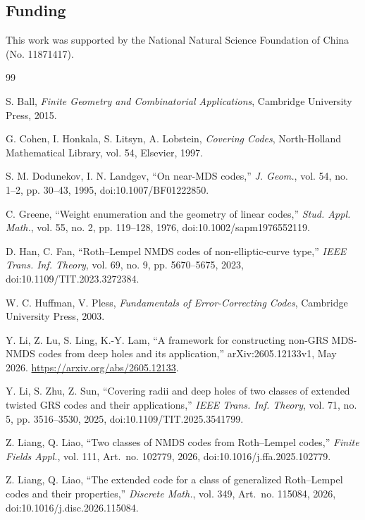 ﻿\documentclass[11pt]{article}
\theoremstyle{plain}
\theoremstyle{definition}
\begin{document}
\subsection*{Funding}
This work was supported by the National Natural Science Foundation of China
(No. 11871417).

\begingroup
{}
\begin{thebibliography}{99}

S. Ball,
\emph{Finite Geometry and Combinatorial Applications},
Cambridge University Press, 2015.

G. Cohen, I. Honkala, S. Litsyn, A. Lobstein,
\emph{Covering Codes},
North-Holland Mathematical Library, vol. 54, Elsevier, 1997.

S. M. Dodunekov, I. N. Landgev,
``On near-MDS codes,''
\emph{J. Geom.}, vol. 54, no. 1--2, pp. 30--43, 1995,
doi:10.1007/BF01222850.

C. Greene,
``Weight enumeration and the geometry of linear codes,''
\emph{Stud. Appl. Math.}, vol. 55, no. 2, pp. 119--128, 1976,
doi:10.1002/sapm1976552119.

D. Han, C. Fan,
``Roth--Lempel NMDS codes of non-elliptic-curve type,''
\emph{IEEE Trans. Inf. Theory}, vol. 69, no. 9, pp. 5670--5675, 2023,
doi:10.1109/TIT.2023.3272384.

W. C. Huffman, V. Pless,
\emph{Fundamentals of Error-Correcting Codes},
Cambridge University Press, 2003.

Y. Li, Z. Lu, S. Ling, K.-Y. Lam,
``A framework for constructing non-GRS MDS-NMDS codes from deep holes and its application,''
arXiv:2605.12133v1, May 2026. \url{https://arxiv.org/abs/2605.12133}.

Y. Li, S. Zhu, Z. Sun,
``Covering radii and deep holes of two classes of extended twisted GRS codes
and their applications,''
\emph{IEEE Trans. Inf. Theory}, vol. 71, no. 5, pp. 3516--3530, 2025,
doi:10.1109/TIT.2025.3541799.

Z. Liang, Q. Liao,
``Two classes of NMDS codes from Roth--Lempel codes,''
\emph{Finite Fields Appl.}, vol. 111, Art.\ no. 102779, 2026,
doi:10.1016/j.ffa.2025.102779.

Z. Liang, Q. Liao,
``The extended code for a class of generalized Roth--Lempel codes and their
properties,''
\emph{Discrete Math.}, vol. 349, Art.\ no. 115084, 2026,
doi:10.1016/j.disc.2026.115084.


\end{thebibliography}
\end{document}
